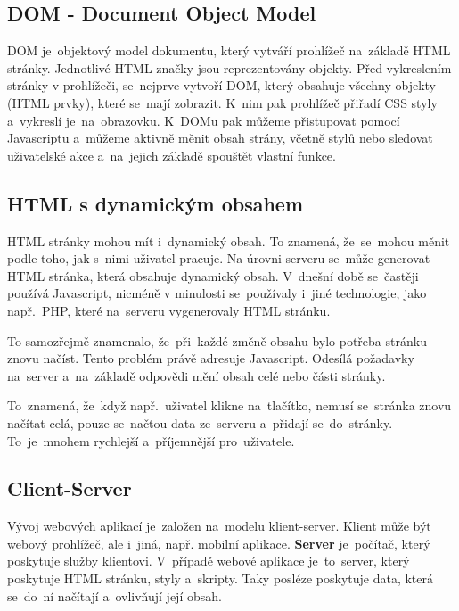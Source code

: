 \documentclass[14pt,a4paper]{article}
\begin{document}
        \subsection{DOM - Document Object Model}
        DOM je~objektový model dokumentu, který vytváří prohlížeč na~základě HTML stránky. Jednotlivé HTML značky jsou reprezentovány objekty.
        Před vykreslením stránky v prohlížeči, se~nejprve vytvoří DOM, který obsahuje všechny objekty (HTML prvky), které se~mají zobrazit.
        K~nim pak prohlížeč přiřadí CSS styly a~vykreslí je~na~obrazovku. K~DOMu pak můžeme přistupovat pomocí Javascriptu
        a~můžeme aktivně měnit obsah strány, včetně stylů nebo sledovat uživatelské akce a~na~jejich základě spouštět vlastní funkce.\parencite[2.1.01]{kantor_javascript}
        
        \subsection{HTML s dynamickým obsahem}
        HTML stránky mohou mít i~dynamický obsah. To znamená, že~se~mohou měnit podle toho, jak s~nimi uživatel pracuje.
        Na úrovni serveru se~může generovat HTML stránka, která obsahuje dynamický obsah. V~dnešní době se~častěji používá Javascript,
        nicméně v minulosti se~používaly i~jiné technologie, jako např.~PHP, které na~serveru vygenerovaly HTML stránku.

        To samozřejmě znamenalo, že~při~každé změně obsahu bylo potřeba stránku znovu načíst. Tento problém právě adresuje Javascript.
        Odesílá požadavky na~server a~na~základě odpovědi mění obsah celé nebo části stránky.

        To~znamená, že~když např.~uživatel klikne na~tlačítko, nemusí se~stránka znovu načítat celá, pouze se~načtou data ze~serveru
        a~přidají se~do~stránky. To~je~mnohem rychlejší a~příjemnější pro~uživatele.
        
        \subsection{Client-Server}
        Vývoj webových aplikací je~založen na~modelu klient-server. Klient může být webový prohlížeč, ale i~jiná, např. mobilní aplikace.
        \textbf{Server} je~počítač, který poskytuje služby klientovi. V~případě webové aplikace je~to~server, který poskytuje HTML stránku, styly a~skripty.
        Taky posléze poskytuje data, která se~do~ní načítají a~ovlivňují její obsah.
\end{document}
